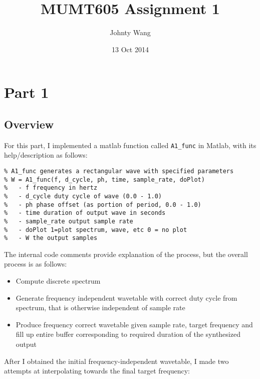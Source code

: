 \documentclass[12pt]{article}
\title{MUMT605 Assignment 1}
\author{Johnty Wang}
\date{13 Oct 2014}
\begin{document}
\maketitle
\section*{Part 1}

\subsection*{Overview}
For this part, I implemented a matlab function called \verb|A1_func| in Matlab, with its help/description as follows:

\begin{verbatim}
% A1_func generates a rectangular wave with specified parameters
% W = A1_func(f, d_cycle, ph, time, sample_rate, doPlot)
%   - f frequency in hertz
%   - d_cycle duty cycle of wave (0.0 - 1.0)
%   - ph phase offset (as portion of period, 0.0 - 1.0)
%   - time duration of output wave in seconds
%   - sample_rate output sample rate
%   - doPlot 1=plot spectrum, wave, etc 0 = no plot
%   - W the output samples
\end{verbatim}

The internal code comments provide explanation of the process, but the overall process is as follows:

\begin{itemize}
\item{Compute discrete spectrum}
\item{Generate frequency independent wavetable with correct duty cycle from spectrum, that is otherwise independent of sample rate}
\item{Produce frequency correct wavetable given sample rate, target frequency and fill up entire buffer corresponding to required duration of the synthesized output}
\end{itemize}

After I obtained the initial frequency-independent wavetable, I made two attempts at interpolating towards the final target frequency:
\end{document}
